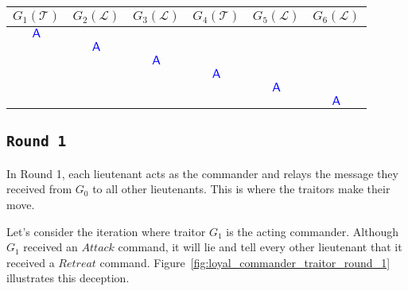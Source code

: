 \documentclass[11pt]{article}
\newcommand{\cmdA}{\ensuremath{\mathsf{A}}} %
\newcommand{\loyal}{\ensuremath{\mathcal{L}}}
\newcommand{\traitor}{\ensuremath{\mathcal{T}}}
\newcommand{\gen}[1]{\ensuremath{G_{#1}}}
\begin{document}
\begin{center}
\vspace{1em} %
\renewcommand{\arraystretch}{1.5}
\setlength{\tabcolsep}{6pt} %
\begin{tabular}{c|c|c|c|c|c}
    \hline
    \textbf{$\gen{1}(\traitor)$} & \textbf{$\gen{2}(\loyal)$} & \textbf{$\gen{3}(\loyal)$} & \textbf{$\gen{4}(\traitor)$} & \textbf{$\gen{5}(\loyal)$} & \textbf{$\gen{6}(\loyal)$} \\
    \hline
    \cellcolor{yellow!30}\textbf{\textcolor{blue}{\cmdA}} & & & & & \\
    \hline
     & \cellcolor{yellow!30}\textbf{\textcolor{blue}{\cmdA}} & & & & \\
    \hline
     & & \cellcolor{yellow!30}\textbf{\textcolor{blue}{\cmdA}} & & & \\
    \hline
     & & & \cellcolor{yellow!30}\textbf{\textcolor{blue}{\cmdA}} & & \\
    \hline
     & & & & \cellcolor{yellow!30}\textbf{\textcolor{blue}{\cmdA}} & \\
    \hline
     & & & & & \cellcolor{yellow!30}\textbf{\textcolor{blue}{\cmdA}} \\
    \hline
\end{tabular}
\label{tab:loyal_commander_round_2_values}
\end{center}

\subsection*{\texttt{\large Round 1}}
\justifying
In Round 1, each lieutenant acts as the commander and relays the message they received from $\gen{0}$ to all other lieutenants. This is where the traitors make their move.

\justifying
Let's consider the iteration where traitor $\gen{1}$ is the acting commander. Although $\gen{1}$ received an $Attack$ command, it will lie and tell every other lieutenant that it received a $Retreat$ command. Figure~\ref{fig:loyal_commander_traitor_round_1} illustrates this deception.
\end{document}

